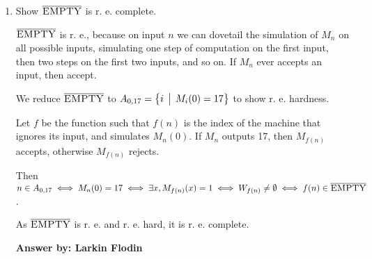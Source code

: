\documentclass[12pt]{article}
\begin{document}
\begin{enumerate}
\item Show $\overline{\mbox{{\rm\sc EMPTY}}}$ is r. e. complete.

$\overline{\mbox{{\rm\sc EMPTY}}}$ is r. e., because on input $n$ we can dovetail the simulation of $M_n$ on all possible inputs, simulating one step of computation on the first input, then two steps on the first two inputs, and so on. If $M_n$ ever accepts an input, then accept.

We reduce $\overline{\mbox{{\rm\sc EMPTY}}}$ to $A_{0, 17} = \bigl\{ i \,\bigm|\, M_i(0) = 17 \bigr\}$ to show r. e. hardness.

Let $f$ be the function such that $f(n)$ is the index of the machine that ignores its input, and simulates $M_n(0)$. If $M_n$ outputs 17, then $M_{f(n)}$ accepts, otherwise $M_{f(n)}$ rejects.

Then $n \in A_{0, 17} \iff M_n(0) = 17 \iff \exists x, M_{f(n)}(x) = 1 \iff W_{f(n)} \neq \emptyset \iff f(n) \in \overline{\mbox{{\rm\sc EMPTY}}}$.

As $\overline{\mbox{{\rm\sc EMPTY}}}$ is r. e. and r. e. hard, it is r. e. complete.

{\bf Answer by: Larkin Flodin} 

\end{enumerate}
\end{document}
